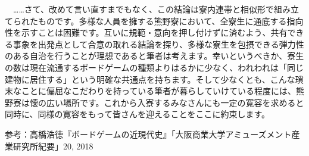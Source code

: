 　……さて、改めて言い直すまでもなく、この結論は寮内連帯と相似形で組み立てられたものです。多様な人員を擁する熊野寮において、全寮生に通底する指向性を示すことは困難です。互いに規範・意向を押し付けずに済むよう、共有できる事象を出発点として合意の取れる結論を探り、多様な寮生を包摂できる弾力性のある自治を行うことが理想であると筆者は考えます。幸いというべきか、寮生の数は現在流通するボードゲームの種類よりはるかに少なく、われわれは「同じ建物に居住する」という明確な共通点を持ちます。そして少なくとも、こんな瑣末なことに偏屈なこだわりを持っている筆者が暮らしていけている程度には、熊野寮は懐の広い場所です。これから入寮するみなさんにも一定の寛容を求めると同時に、同様の寛容をもって皆さんを迎えることをここに約束します。

参考：高橋浩徳『ボードゲームの近現代史』「大阪商業大学アミューズメント産業研究所紀要」20, 2018

